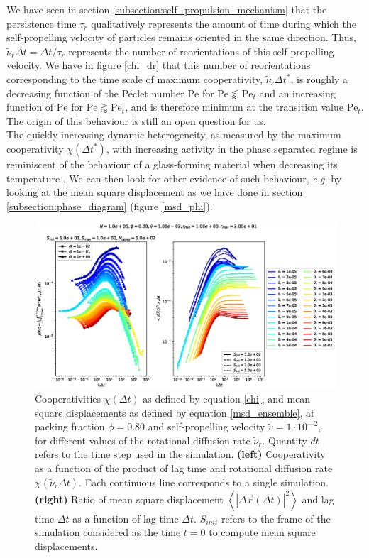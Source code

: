 \documentclass[class=report, float=false, crop=false]{standalone}
\begin{document}
We have seen in section \ref{subsection:self_propulsion_mechanism} that the persistence time $\tau_r$ qualitatively represents the amount of time during which the self-propelling velocity of particles remains oriented in the same direction. Thus, $\tilde{\nu}_r \Delta t = \Delta t/\tau_r$ represents the number of reorientations of this self-propelling velocity. We have in figure \ref{chi_dr} that this number of reorientations corresponding to the time scale of maximum cooperativity, $\tilde{\nu}_r \Delta t^*$, is roughly a decreasing function of the P\'eclet number $\text{Pe}$ for $\text{Pe} \lessapprox \text{Pe}_t$ and an increasing function of $\text{Pe}$ for $\text{Pe} \gtrapprox \text{Pe}_t$, and is therefore minimum at the transition value $\text{Pe}_t$. The origin of this behaviour is still an open question for us.\\

The quickly increasing dynamic heterogeneity, as measured by the maximum cooperativity $\chi(\Delta t^*)$, with increasing activity in the phase separated regime is reminiscent of the behaviour of a glass-forming material when decreasing its temperature \cite{berthier2011dynamic, cavagna2009supercooled}. We can then look for other evidence of such behaviour, \textit{e.g.} by looking at the mean square displacement as we have done in section \ref{subsection:phase_diagram} (figure \ref{msd_phi}).\\

\begin{figure}[h!]
\centering
\includegraphics[width=\textwidth]{figures/figs/intCuu_msdt_Dk8000_Vj1000_Nq1000_Io5000_Mn1000_Cn5000_RMINl1000_RMAXm2000.eps}
\caption{Cooperativities $\chi(\Delta t)$ as defined by equation \ref{chi}, and mean square displacements as defined by equation \ref{msd_ensemble}, at packing fraction $\phi = 0.80$ and self-propelling velocity $\tilde{v} = 1\cdot10^{—2}$, for different values of the rotational diffusion rate $\tilde{\nu}_r$. Quantity $dt$ refers to the time step used in the simulation. \textbf{(left)} Cooperativity as a function of the product of lag time and rotational diffusion rate $\chi(\tilde{\nu}_r \Delta t)$. Each continuous line corresponds to a single simulation. \textbf{(right)} Ratio of mean square displacement $\left<|\Delta\vec{r}(\Delta t)|^2\right>$ and lag time $\Delta t$ as a function of lag time $\Delta t$. $S_{init}$ refers to the frame of the simulation considered as the time $t=0$ to compute mean square displacements.}
\label{chi_dr_msd}
\end{figure}
\end{document}
